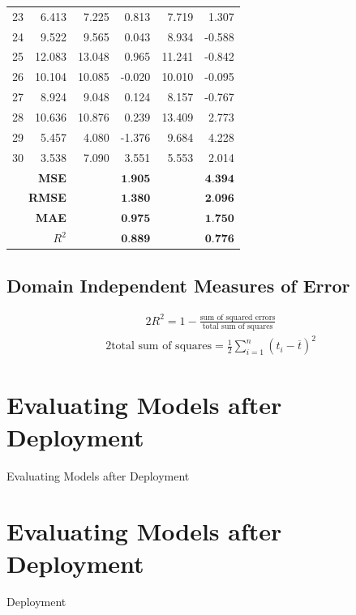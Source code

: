 \documentclass[xcolor={table}]{beamer}
\newcommand{\SectionSlideShortHeader}[3][]{
	\ifthenelse{\isempty{#1}}
		{\section[#3]{#2}\begin{frame} \begin{center}\begin{huge}#2\end{huge}\end{center}\end{frame}}
		{\section[#1]{#2}\begin{frame} \begin{center}\begin{huge}#3\end{huge}\end{center}\end{frame}}
}
\begin{document}
\begin{frame} [plain]
\begin{table}[!bht]
\begin{tiny}
\begin{tabular}{ c r r r r r }
23	&	6.413	&	7.225	&	0.813	&	7.719	&	1.307	\\
24	&	9.522	&	9.565	&	0.043	&	8.934	&	-0.588	\\
25	&	12.083	&	13.048	&	0.965	&	11.241	&	-0.842	\\
26	&	10.104	&	10.085	&	-0.020	&	10.010	&	-0.095	\\
27	&	8.924	&	9.048	&	0.124	&	8.157	&	-0.767	\\
28	&	10.636	&	10.876	&	0.239	&	13.409	&	2.773	\\
29	&	5.457	&	4.080	&	-1.376	&	9.684	&	4.228	\\
30	&	3.538	&	7.090	&	3.551	&	5.553	&	2.014	\\
\hline 
\multicolumn{2}{r}{\textbf{MSE}} &  \multicolumn{2}{r}{$\textbf{1.905}$} &   \multicolumn{2}{r}{$\textbf{4.394}$} \\
\multicolumn{2}{r}{\textbf{RMSE}} &  \multicolumn{2}{r}{$\textbf{1.380}$} &   \multicolumn{2}{r}{$\textbf{2.096}$} \\
\multicolumn{2}{r}{\textbf{MAE}} &  \multicolumn{2}{r}{$\textbf{0.975}$} &   \multicolumn{2}{r}{$\textbf{1.750}$} \\
\multicolumn{2}{r}{\textbf{$R^2$}} &  \multicolumn{2}{r}{$\textbf{0.889}$} &   \multicolumn{2}{r}{$\textbf{0.776}$} \\
\hline
\end{tabular}
\end{tiny}
\end{table}
\end{frame} 

\subsection{Domain Independent Measures of Error}

 \begin{frame} 
\begin{alignat}{2}
R^2 = 1 - \frac{\text{sum of squared errors}}{\text{total sum of squares}}  \label{eqn:rSquaredEval}
\end{alignat}
\begin{alignat}{2}
\text{total sum of squares} = \frac{1}{2}\sum_{i=1}^{n} \left( t_i - \overline{t} \right)^2 \label{eqn:sstEval}
\end{alignat}
\end{frame} 


\SectionSlideShortHeader{Evaluating Models after Deployment}{Deployment}
\end{document}
